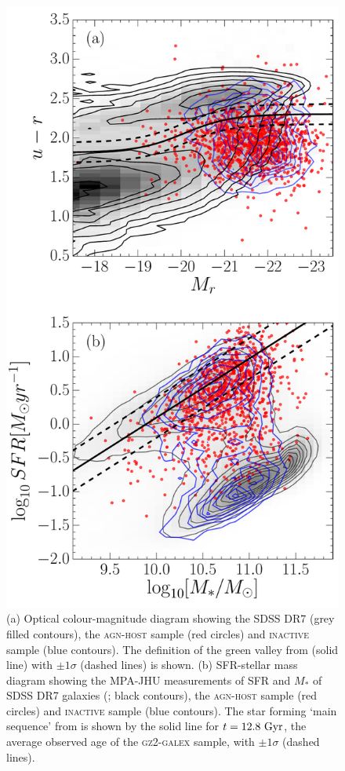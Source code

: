 \begin{figure}
\centering
\includegraphics[height=0.75\textheight]{agn/fig3.pdf}
\caption[Colour-magnitude and SFR-mass diagram for \textsc{agn-host} galaxies]{(a) Optical colour-magnitude diagram showing the SDSS DR7 (grey filled contours), the \textsc{agn-host} sample (red circles) and \textsc{inactive} sample (blue contours). The definition of the green valley from \citet{Baldry06} (solid line) with $\pm 1\sigma$ (dashed lines) is shown. (b) SFR-stellar mass diagram showing the MPA-JHU measurements of SFR and $M_*$ of SDSS DR7 galaxies (\citealt{kauffmann03, brinchmann04}; black contours), the \textsc{agn-host} sample (red circles) and \textsc{inactive} sample (blue contours). The star forming `main sequence' from \citet{peng10} is shown by the solid line for $t = 12.8~\rm{Gyr}$, the average observed age of the \textsc{gz2-galex} sample, with $\pm1\sigma$ (dashed lines).}
\label{cmdsfms}
\end{figure}


